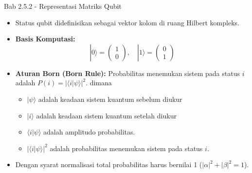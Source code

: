 \begin{frame}{Bab 2.5.2 - Representasi Matriks Qubit}
    \begin{itemize}
        \item Status qubit didefinisikan sebagai vektor kolom di ruang Hilbert kompleks.
        \item \textbf{Basis Komputasi:}
        \begin{equation*}
            |0\rangle = \begin{pmatrix} 1 \\ 0 \end{pmatrix}, \quad |1\rangle = \begin{pmatrix} 0 \\ 1 \end{pmatrix}
        \end{equation*}
        \item \textbf{Aturan Born (Born Rule):} Probabilitas menemukan sistem pada status $i$ adalah $P(i) = |\langle i | \psi \rangle|^2$.
        dimana
        \begin{itemize}
            \item $|\psi\rangle$ adalah keadaan sistem kuantum sebelum diukur
            \item $|i\rangle$ adalah keadaan sistem kuantum setelah diukur
            \item $\langle i | \psi \rangle$ adalah amplitudo probabilitas.
            \item $|\langle i | \psi \rangle|^2$ adalah probabilitas menemukan sistem pada status $i$.
        \end{itemize}
        \item Dengan syarat normalisasi total probabilitas harus bernilai 1 ($|\alpha|^2 + |\beta|^2 = 1$).
    \end{itemize}
\end{frame}

